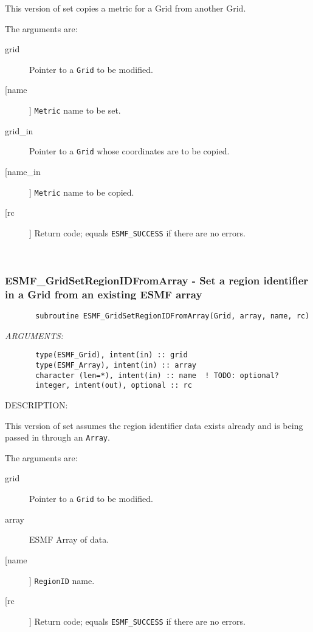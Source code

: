        This version of set copies a metric for a Grid from another Grid.
  
       The arguments are:
       \begin{description}
       \item[grid]
            Pointer to a {\tt Grid} to be modified.
       \item [[name]]
             {\tt Metric} name to be set.
       \item[grid\_in]
            Pointer to a {\tt Grid} whose coordinates are to be copied.
       \item [[name\_in]]
             {\tt Metric} name to be copied.
       \item[[rc]]
            Return code; equals {\tt ESMF\_SUCCESS} if there are no errors.
       \end{description}
   
 
\mbox{}\hrulefill\ 
 
\subsubsection{ESMF\_GridSetRegionIDFromArray - Set a region identifier in a Grid from an existing ESMF array}


 
\begin{verbatim}       subroutine ESMF_GridSetRegionIDFromArray(Grid, array, name, rc)\end{verbatim}{\em ARGUMENTS:}
\begin{verbatim}       type(ESMF_Grid), intent(in) :: grid
       type(ESMF_Array), intent(in) :: array
       character (len=*), intent(in) :: name  ! TODO: optional?
       integer, intent(out), optional :: rc\end{verbatim}
{\sf DESCRIPTION:\\ }


       This version of set assumes the region identifier data exists already
       and is being passed in through an {\tt Array}.
  
       The arguments are:
       \begin{description}
       \item[grid]
            Pointer to a {\tt Grid} to be modified.
       \item[array]
            ESMF Array of data.
       \item [[name]]
             {\tt RegionID} name.
       \item[[rc]]
            Return code; equals {\tt ESMF\_SUCCESS} if there are no errors.
       \end{description}
   
